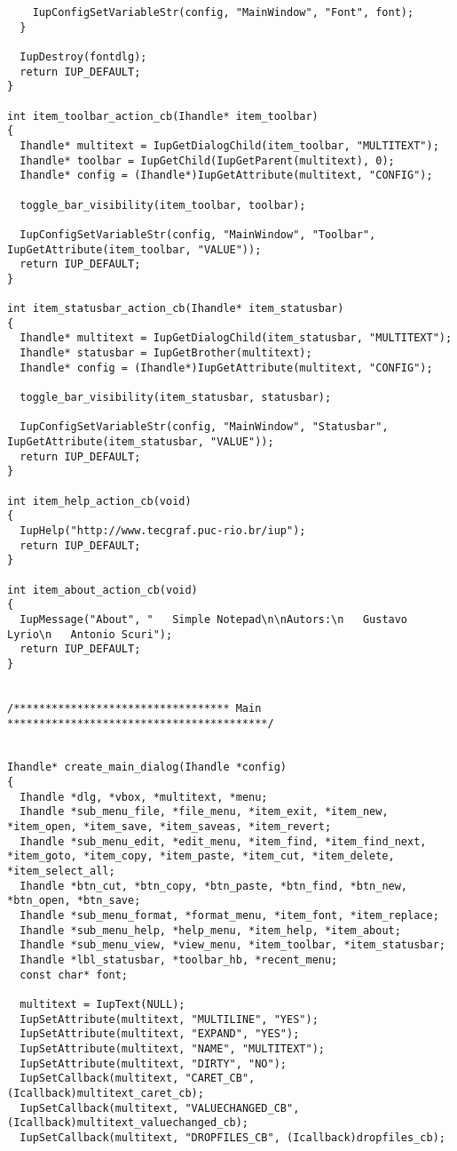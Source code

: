 \documentclass{ctexart}
\begin{document}
\begin{lstlisting}
    IupConfigSetVariableStr(config, "MainWindow", "Font", font);
  }

  IupDestroy(fontdlg);
  return IUP_DEFAULT;
}

int item_toolbar_action_cb(Ihandle* item_toolbar)
{
  Ihandle* multitext = IupGetDialogChild(item_toolbar, "MULTITEXT");
  Ihandle* toolbar = IupGetChild(IupGetParent(multitext), 0);
  Ihandle* config = (Ihandle*)IupGetAttribute(multitext, "CONFIG");

  toggle_bar_visibility(item_toolbar, toolbar);

  IupConfigSetVariableStr(config, "MainWindow", "Toolbar", IupGetAttribute(item_toolbar, "VALUE"));
  return IUP_DEFAULT;
}

int item_statusbar_action_cb(Ihandle* item_statusbar)
{
  Ihandle* multitext = IupGetDialogChild(item_statusbar, "MULTITEXT");
  Ihandle* statusbar = IupGetBrother(multitext);
  Ihandle* config = (Ihandle*)IupGetAttribute(multitext, "CONFIG");

  toggle_bar_visibility(item_statusbar, statusbar);

  IupConfigSetVariableStr(config, "MainWindow", "Statusbar", IupGetAttribute(item_statusbar, "VALUE"));
  return IUP_DEFAULT;
}

int item_help_action_cb(void)
{
  IupHelp("http://www.tecgraf.puc-rio.br/iup");
  return IUP_DEFAULT;
}

int item_about_action_cb(void)
{
  IupMessage("About", "   Simple Notepad\n\nAutors:\n   Gustavo Lyrio\n   Antonio Scuri");
  return IUP_DEFAULT;
}


/********************************** Main *****************************************/


Ihandle* create_main_dialog(Ihandle *config)
{
  Ihandle *dlg, *vbox, *multitext, *menu;
  Ihandle *sub_menu_file, *file_menu, *item_exit, *item_new, *item_open, *item_save, *item_saveas, *item_revert;
  Ihandle *sub_menu_edit, *edit_menu, *item_find, *item_find_next, *item_goto, *item_copy, *item_paste, *item_cut, *item_delete, *item_select_all;
  Ihandle *btn_cut, *btn_copy, *btn_paste, *btn_find, *btn_new, *btn_open, *btn_save;
  Ihandle *sub_menu_format, *format_menu, *item_font, *item_replace;
  Ihandle *sub_menu_help, *help_menu, *item_help, *item_about;
  Ihandle *sub_menu_view, *view_menu, *item_toolbar, *item_statusbar;
  Ihandle *lbl_statusbar, *toolbar_hb, *recent_menu;
  const char* font;

  multitext = IupText(NULL);
  IupSetAttribute(multitext, "MULTILINE", "YES");
  IupSetAttribute(multitext, "EXPAND", "YES");
  IupSetAttribute(multitext, "NAME", "MULTITEXT");
  IupSetAttribute(multitext, "DIRTY", "NO");
  IupSetCallback(multitext, "CARET_CB", (Icallback)multitext_caret_cb);
  IupSetCallback(multitext, "VALUECHANGED_CB", (Icallback)multitext_valuechanged_cb);
  IupSetCallback(multitext, "DROPFILES_CB", (Icallback)dropfiles_cb);


\end{lstlisting}
\end{document}
